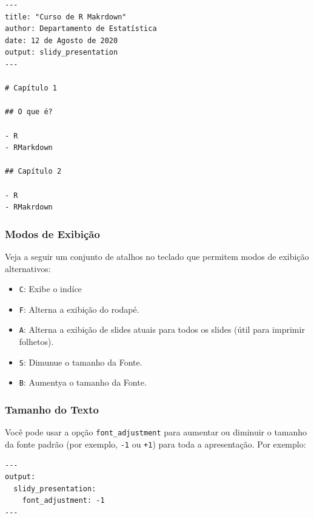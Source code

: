 \documentclass[
]{book}
\providecommand{\tightlist}{%
  \setlength{\itemsep}{0pt}\setlength{\parskip}{0pt}}
\begin{document}
\begin{verbatim}
---
title: "Curso de R Makrdown"
author: Departamento de Estatística
date: 12 de Agosto de 2020
output: slidy_presentation
---

# Capítulo 1

## O que é?

- R
- RMarkdown

## Capítulo 2

- R
- RMakrdown
\end{verbatim}

\hypertarget{modos-de-exibiuxe7uxe3o}{%
\subsubsection*{Modos de Exibição}\label{modos-de-exibiuxe7uxe3o}}

Veja a seguir um conjunto de atalhos no teclado que permitem modos de exibição alternativos:

\begin{itemize}
\tightlist
\item
  \texttt{\textquotesingle{}C\textquotesingle{}}: Exibe o indíce
\item
  \texttt{\textquotesingle{}F\textquotesingle{}}: Alterna a exibição do rodapé.
\item
  \texttt{\textquotesingle{}A\textquotesingle{}}: Alterna a exibição de slides atuais para todos os slides (útil para imprimir folhetos).
\item
  \texttt{\textquotesingle{}S\textquotesingle{}}: Dimunue o tamanho da Fonte.
\item
  \texttt{\textquotesingle{}B\textquotesingle{}}: Aumentya o tamanho da Fonte.
\end{itemize}

\hypertarget{tamanho-do-texto}{%
\subsubsection*{Tamanho do Texto}\label{tamanho-do-texto}}

Você pode usar a opção \texttt{font\_adjustment} para aumentar ou diminuir o tamanho da fonte padrão (por exemplo, \texttt{-1} ou \texttt{+1}) para toda a apresentação. Por exemplo:

\begin{verbatim}
---
output:
  slidy_presentation:
    font_adjustment: -1
---
\end{verbatim}
\end{document}
